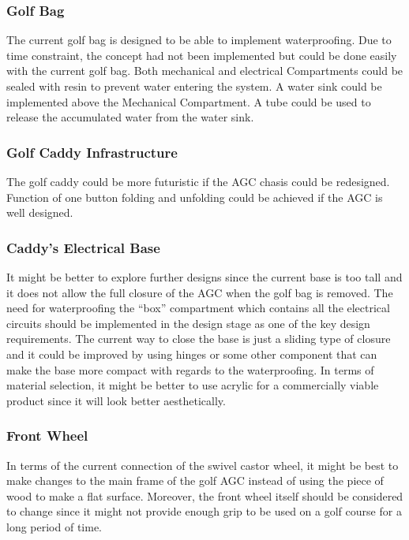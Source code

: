 \documentclass[11pt,landscape]{article}
\begin{document}
\begin{multicols}{2}
\subsubsection{Golf Bag}
The current golf bag is designed to be able to implement waterproofing. Due
to time constraint, the concept had not been implemented but could be done
easily with the current golf bag. Both mechanical and electrical Compartments
could be sealed with resin to prevent water entering the system. A water
sink could be implemented above the Mechanical Compartment. A tube could be
used to release the accumulated water from the water sink.

\subsubsection{Golf Caddy Infrastructure}
The golf caddy could be more futuristic if the AGC chasis could be redesigned.
Function of one button folding and unfolding could be achieved if the AGC is
well designed.

\subsubsection{Caddy's Electrical Base}
It might be better to explore further designs since the current base is too
tall and it does not allow the full closure of the AGC when the golf bag
is removed. The need for waterproofing the “box” compartment which contains
all the electrical circuits should be implemented in the design stage as one
of the key design requirements. The current way to close the base is just a
sliding type of closure and it could be improved by using hinges or some
other component that can make the base more compact with regards to the
waterproofing. In terms of material selection, it might be better to use
acrylic for a commercially viable product since it will look better
aesthetically. 

\subsubsection{Front Wheel}
In terms of the current connection of the swivel castor wheel, it might be
best to make changes to the main frame of the golf AGC instead of using
the piece of wood to make a flat surface. Moreover, the front wheel itself
should be considered to change since it might not provide enough grip to be
used on a golf course for a long period of time.
    
\end{multicols}
\end{document}
